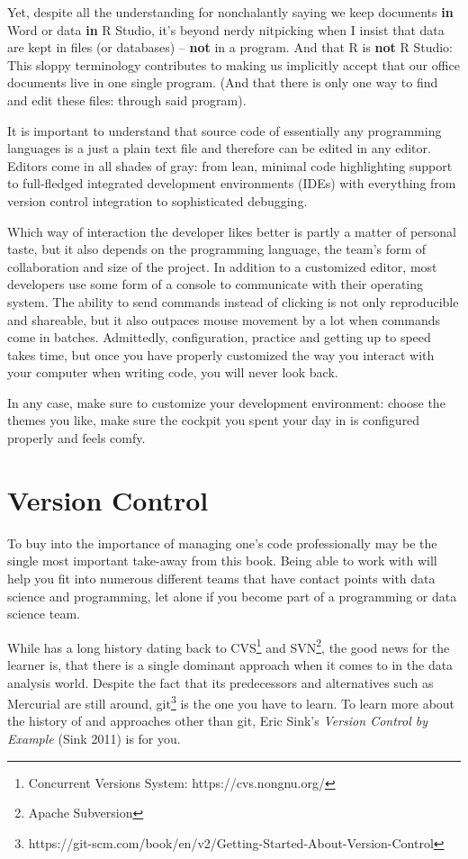 \documentclass[
  12pt,
  letterpaper,
]{krantz}
\begin{document}
Yet, despite all the understanding for nonchalantly saying we keep
documents \textbf{in} Word or data \textbf{in} R Studio, it's beyond
nerdy nitpicking when I insist that data are kept in files (or
databases) -- \textbf{not} in a program. And that R is
\textbf{not} R Studio: This sloppy terminology contributes to making us
implicitly accept that our office documents live in one single program.
(And that there is only one way to find and edit these files: through
said program).

It is important to understand that source code of essentially any
programming languages is a just a plain text file and therefore can be
edited in any editor. Editors come in all shades of gray: from lean,
minimal code highlighting support to full-fledged integrated development
environments (IDEs) with everything from version control integration to
sophisticated debugging.

Which way of interaction the developer likes better is partly a matter
of personal taste, but it also depends on the programming language, the
team's form of collaboration and size of the project. In addition to a
customized editor, most developers use some form of a console to
communicate with their operating system. The ability to send commands
instead of clicking is not only reproducible and shareable, but it also
outpaces mouse movement by a lot when commands come in batches.
Admittedly, configuration, practice and getting up to speed takes time,
but once you have properly customized the way you interact with your
computer when writing code, you will never look back.

In any case, make sure to customize your development environment: choose
the themes you like, make sure the cockpit you spent your day in is
configured properly and feels comfy.

\hypertarget{version-control}{%
\section{Version Control}\label{version-control}}

To buy into the importance of managing one's code professionally may be
the single most important take-away from this book. Being able to work
with  will help you fit into numerous different
teams that have contact points with data science and programming, let
alone if you become part of a programming or data science team.

While  has a long history dating back to
CVS\footnote{Concurrent Versions System: https://cvs.nongnu.org/} and
SVN\footnote{Apache Subversion}, the good news for the learner is, that
there is a single dominant approach when it comes to
 in the data analysis world. Despite the fact
that its predecessors and alternatives such as Mercurial are still
around, git\footnote{https://git-scm.com/book/en/v2/Getting-Started-About-Version-Control}
is the one you have to learn. To learn more about the history of
 and approaches other than git, Eric Sink's
\emph{Version Control by Example} (Sink 2011) is for you.
\end{document}
